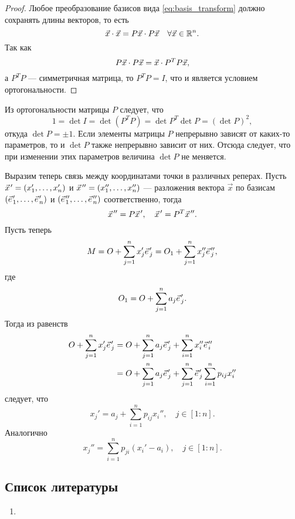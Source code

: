 \begin{proof}
  Любое преобразование базисов вида \ref{eq:basis_transform} должно сохранять
  длины векторов, то есть
  \begin{equation*}
    \vec{x} \cdot \vec{x} = P \vec{x} \cdot P \vec{x} \quad \forall
      \vec{x} \in \mathbb{R}^n .
  \end{equation*}
  Так как
  \begin{equation*}
    P \vec{x} \cdot P \vec{x} = \vec{x} \cdot P^T P \vec{x},
  \end{equation*}
  а $P^T P$ --- симметричная матрица, то $P^T P = I$, что и является условием
  ортогональности.
\end{proof}

Из ортогональности матрицы $P$ следует, что
\begin{equation*}
  1 = \det I = \det (P^T P) = \det P^T \det P = (\det P)^2,
\end{equation*}
откуда $\det P = \pm 1$. Если элементы матрицы $P$ непрерывно зависят от
каких-то параметров, то и $\det P$ также непрерывно зависит от них. Отсюда
следует, что при изменении этих параметров величина $\det P$ не меняется.

Выразим теперь связь между координатами точки в различных реперах. Пусть
$\pvec{x} = (x_1', \dots, x_n')$ и $\ppvec{x} = (x_1'', \dots, x_n'')$ ---
разложения вектора $\vec{x}$ по базисам $(\pvec{e}_1, \dots, \pvec{e}_n)$ и
$(\ppvec{e}_1, \dots, \ppvec{e}_n)$ соответственно, тогда
\begin{equation*}
  \ppvec{x} = P \pvec{x}, \quad \pvec{x} = P^T \ppvec{x}.
\end{equation*}
Пусть теперь
\begin{equation*}
  M = O + \sum_{j=1}^n x_j' \pvec{e}_j = O_1 + \sum_{j=1}^n x_j'' \ppvec{e}_j,
\end{equation*}
где
\begin{equation*}
  O_1 = O + \sum_{j=1}^n a_j \pvec{e}_j.
\end{equation*}
Тогда из равенств
\begin{equation*}
  \begin{aligned}
    O + \sum_{j=1}^n x_j' \pvec{e}_j &= O + \sum_{j=1}^n a_j \pvec{e}_j +
      \sum_{i=1}^n x_i'' \ppvec{e}_i \\
    &= O + \sum_{j=1}^n a_j \pvec{e}_j +
      \sum_{j=1}^n \pvec{e}_j \sum_{i=1}^n p_{ij} x_i''
  \end{aligned}
\end{equation*}
следует, что
\begin{equation}
  x_j' = a_j + \sum_{i=1}^n p_{ij} x_i'', \quad j \in [1:n].
\end{equation}
Аналогично
\begin{equation}
  x_j'' = \sum_{i=1}^n p_{ji} (x_i' - a_i), \quad j \in [1:n].
\end{equation}

\subsection{Список литературы}
\begin{enumerate}
  \item \cite{lectures}
\end{enumerate}

